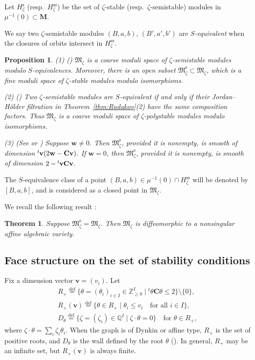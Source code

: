 \documentclass[11pt]{article}
\newtheorem{Theorem}[equation]{Theorem}
\newtheorem{Proposition}[equation]{Proposition}
\theoremstyle{definition}
\numberwithin{equation}{section}
\newcommand{\lsp}[2]{{\mskip-.3mu}{}^{#1}\mskip-1mu{#2}}
\newcommand{\defeq}{\overset{\operatorname{\scriptstyle def}}{=}}
\newcommand{\Z}{{\mathbb Z}}
\newcommand{\Q}{{\mathbb Q}}
\newcommand{\bM}{{\mathbf M}} %
\newcommand{\M}{{\mathfrak M}} %
\newcommand{\Mreg}{\M^{\operatorname{s}}}
\newcommand{\bv}{{\mathbf v}} %
\newcommand{\bw}{{\mathbf w}} %
\newcommand{\bC}{{\mathbf C}} %
\begin{document}
Let $H_{\zeta}^{\operatorname{s}}$ (resp.\
$H_{\zeta}^{\operatorname{ss}}$) be the set of
$\zeta$-stable (resp.\ $\zeta$-semistable) modules in
$\mu^{-1}(0)\subset\bM$.

We say two $\zeta$-semistable modules $(B,a,b)$, $(B',a',b')$
are {\it $S$-equivalent\/} when the closures of orbits intersect in
$H_{\zeta}^{\operatorname{ss}}$.

\begin{Proposition}\label{prop:dim}
  \textup{(1) (\cite{King})} $\M_\zeta$ is a coarse moduli space of
  $\zeta$-semistable modules modulo $S$-equivalences.
%
  Moreover, there is an open subset $\Mreg_\zeta\subset\M_\zeta$,
  which is a fine moduli space of $\zeta$-stable modules modulo
  isomorphisms.

  \textup{(2) (\cite{King})} Two $\zeta$-semistable modules are
  $S$-equivalent if and only if their Jordan--H\"older filtration
  in Theorem~{\rm \ref{thm:Rudakov}(2)} have the same composition factors. Thus
  $\M_\zeta$ is a coarse moduli space of $\zeta$-polystable modules
  modulo isomorphisms.

  \textup{(3) (See \cite[2.6]{Na-quiver} or \cite[{3.12}]{Na-alg})}
  Suppose $\bw \neq 0$. Then
  $\Mreg_\zeta$, provided it is nonempty, is smooth of dimension
\(
   \lsp{t}{\bv}(2\bw - \bC \bv).
\)
If $\bw = 0$, then $\Mreg_\zeta$, provided it is nonempty, is smooth
of dimension
\(
   2 - \lsp{t}{\bv}\bC \bv.
\)
\end{Proposition}

The $S$-equivalence class of a point $(B,a,b)\in\mu^{-1}(0)\cap
H_{\zeta}^{\operatorname{ss}}$ will be denoted by $[B,a,b]$, and is
considered as a closed point in $\M_\zeta$.



We recall the following result \cite[3.1, 4.2]{Na-quiver}:

\begin{Theorem}\label{thm:affine}
  Suppose $\Mreg_\zeta = \M_\zeta$. Then $\M_\zeta$ is diffeomorphic
  to a nonsingular affine algebraic variety.
\end{Theorem}

\subsection{Face structure on the set of stability conditions}

Fix a dimension vector $\bv = (v_i)$. Let
\begin{gather*}
   R_+  \defeq \{ \theta = (\theta_i)_{i\in I} \in \Z_{\ge 0}^I \mid
     {}^t\theta \bC \theta \le 2\} \setminus \{0\}, \\
   R_+(\bv) \defeq \{ \theta\in R_+ \mid \theta_i \le v_i
       \quad\text{for all $i\in I$}\}, \\
   D_\theta \defeq \{ \zeta = (\zeta_i)\in \Q^I \mid
   \zeta\cdot \theta = 0 \} \quad\text{for $\theta\in R_+$},
\end{gather*}
where $\zeta\cdot \theta = \sum_i \zeta_i\theta_i$. When the graph is
of Dynkin or af\/f\/ine type, $R_+$ is the set of positive roots, and
$D_\theta$ is the wall def\/ined by the root $\theta$
(\cite[Proposition~5.10]{Kac}).
%
In general, $R_+$ may be an inf\/inite set, but $R_+(\bv)$ is always
f\/inite.
\end{document}
